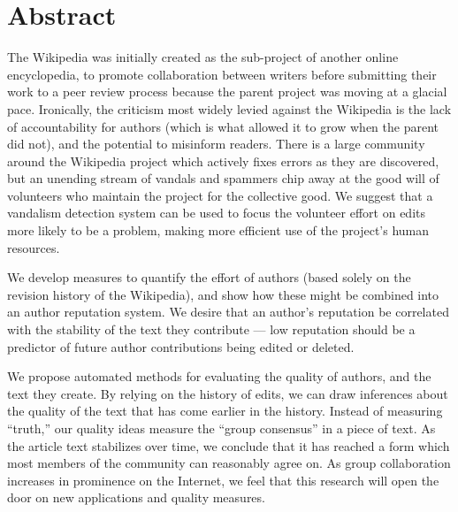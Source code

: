 \chapter{Abstract}
\begin{comment}
WikiTrust: Measuring Group Collaboration
by
B. Thomas Adler
\end{comment}

The Wikipedia was initially created as the sub-project of another
online encyclopedia, to promote collaboration between writers
before submitting their work to a peer review process because
the parent project was moving at a glacial pace.
Ironically, the criticism most widely levied against the Wikipedia
is the lack of accountability
for authors (which is what allowed it to grow when the parent did not),
and the potential to misinform readers.
There is a large community around the Wikipedia project which actively
fixes errors as they are discovered, but an unending
stream of vandals and spammers chip
away at the good will of volunteers who
maintain the project for the collective good.
We suggest that a vandalism detection system
can be used to focus
the volunteer effort on edits more likely to be a problem,
making more efficient use of the project's human resources.

We develop measures to quantify the effort of authors
(based solely on the revision history of the Wikipedia),
and show how these might be combined into an author
reputation system.
We desire that an author's reputation be correlated with the
stability of the text they contribute ---
low reputation should be a predictor of future author
contributions being edited or deleted.

We propose automated methods for evaluating the quality of
authors, and the text they create.
By relying on the history of edits, we can draw inferences about
the quality of the text that has come earlier in the history.
Instead of measuring ``truth,'' our quality ideas
measure the ``group consensus'' in a piece of text.
As the article text stabilizes over time, we conclude that
it has reached a form which most members of the community can
reasonably agree on.
As group collaboration increases in prominence on the Internet,
we feel that this research will open the door on new applications
and quality measures.

